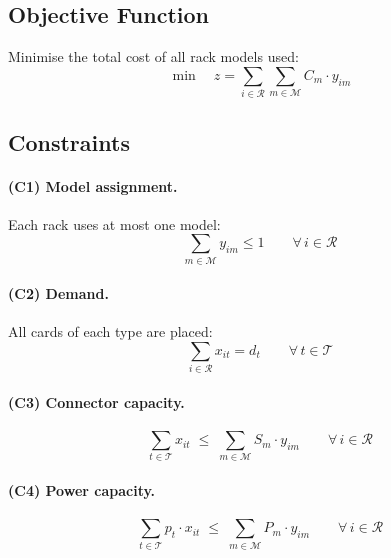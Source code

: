 \documentclass[11pt,a4paper]{article}
\newcommand{\setR}{\mathcal{R}}
\newcommand{\setM}{\mathcal{M}}
\newcommand{\setT}{\mathcal{T}}
\begin{document}
\subsection{Objective Function}

Minimise the total cost of all rack models used:
\begin{equation}\label{eq:ilp-obj}
  \min \quad z = \sum_{i \in \setR} \sum_{m \in \setM} C_m \cdot y_{im}
\end{equation}

\subsection{Constraints}

\paragraph{(C1) Model assignment.}
Each rack uses at most one model:
\begin{equation}\label{eq:ilp-model}
  \sum_{m \in \setM} y_{im} \le 1
  \qquad \forall\, i \in \setR
\end{equation}

\paragraph{(C2) Demand.}
All cards of each type are placed:
\begin{equation}\label{eq:ilp-demand}
  \sum_{i \in \setR} x_{it} = d_t
  \qquad \forall\, t \in \setT
\end{equation}

\paragraph{(C3) Connector capacity.}
\begin{equation}\label{eq:ilp-conn}
  \sum_{t \in \setT} x_{it}
  \;\le\;
  \sum_{m \in \setM} S_m \cdot y_{im}
  \qquad \forall\, i \in \setR
\end{equation}

\paragraph{(C4) Power capacity.}
\begin{equation}\label{eq:ilp-power}
  \sum_{t \in \setT} p_t \cdot x_{it}
  \;\le\;
  \sum_{m \in \setM} P_m \cdot y_{im}
  \qquad \forall\, i \in \setR
\end{equation}
\end{document}
